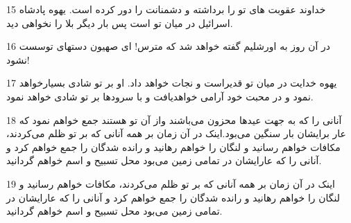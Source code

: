 \par 15 خداوند عقوبت های تو را برداشته و دشمنانت را دور کرده است. یهوه پادشاه اسرائیل در میان تو است پس بار دیگر بلا را نخواهی دید.
\par 16 در آن روز به اورشلیم گفته خواهد شد که مترس! ای صهیون دستهای توسست نشود!
\par 17 یهوه خدایت در میان تو قدیراست و نجات خواهد داد. او بر تو شادی بسیارخواهد نمود و در محبت خود آرامی خواهدیافت و با سرودها بر تو شادی خواهد نمود.
\par 18 آنانی را که به جهت عیدها محزون می‌باشند واز آن تو هستند جمع خواهم نمود که عار برایشان بار سنگین می‌بود.اینک در آن زمان بر همه آنانی که بر تو ظلم می‌کردند، مکافات خواهم رسانید و لنگان را خواهم رهانید و رانده شدگان را جمع خواهم کرد و آنانی را که عارایشان در تمامی زمین می‌بود محل تسبیح و اسم خواهم گردانید.
\par 19 اینک در آن زمان بر همه آنانی که بر تو ظلم می‌کردند، مکافات خواهم رسانید و لنگان را خواهم رهانید و رانده شدگان را جمع خواهم کرد و آنانی را که عارایشان در تمامی زمین می‌بود محل تسبیح و اسم خواهم گردانید.


